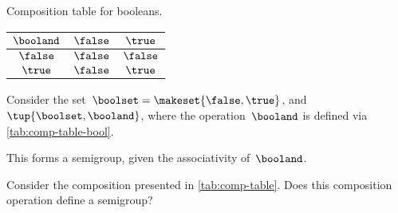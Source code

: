 \begin{margintable}
    \caption{Composition table for booleans.}
    \label{tab:comp-table-bool}
    \centering
    \begin{tabular}{c|cc}
        $\booland$ & $\false$ & $\true$ \\
        \hline
        $\false$   & $\false$ & $\false$ \\
        $\true$    & $\false$ & $\true$
    \end{tabular}
\end{margintable}

\begin{example}[Booleans]
    \label{exa:booleans-table}
    \label{ex:bool_semigroup}
    Consider the set~$\boolset=\makeset{\false, \true}$, and~$\tup{\boolset,\booland}$, where the operation~$\booland$ is defined via \cref{tab:comp-table-bool}.

    This forms a semigroup, given the associativity of~$\booland$.
\end{example}

\begin{gradedexercise}
    \label{ex:CompositionTable}
    Consider the composition presented in \cref{tab:comp-table}.
    Does this composition operation define a semigroup?
\end{gradedexercise}

